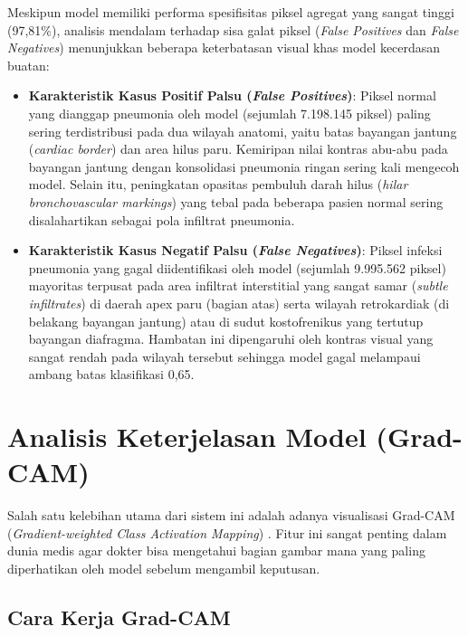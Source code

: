\documentclass[12pt,a4paper,oneside]{book}
\begin{document}
Meskipun model memiliki performa spesifisitas piksel agregat yang sangat tinggi (97,81\%), analisis mendalam terhadap sisa galat piksel (\textit{False Positives} dan \textit{False Negatives}) menunjukkan beberapa keterbatasan visual khas model kecerdasan buatan:
\begin{itemize}
  \item \textbf{Karakteristik Kasus Positif Palsu (\textit{False Positives})}: Piksel normal yang dianggap pneumonia oleh model (sejumlah 7.198.145 piksel) paling sering terdistribusi pada dua wilayah anatomi, yaitu batas bayangan jantung (\textit{cardiac border}) dan area hilus paru. Kemiripan nilai kontras abu-abu pada bayangan jantung dengan konsolidasi pneumonia ringan sering kali mengecoh model. Selain itu, peningkatan opasitas pembuluh darah hilus (\textit{hilar bronchovascular markings}) yang tebal pada beberapa pasien normal sering disalahartikan sebagai pola infiltrat pneumonia.
  \item \textbf{Karakteristik Kasus Negatif Palsu (\textit{False Negatives})}: Piksel infeksi pneumonia yang gagal diidentifikasi oleh model (sejumlah 9.995.562 piksel) mayoritas terpusat pada area infiltrat interstitial yang sangat samar (\textit{subtle infiltrates}) di daerah apex paru (bagian atas) serta wilayah retrokardiak (di belakang bayangan jantung) atau di sudut kostofrenikus yang tertutup bayangan diafragma. Hambatan ini dipengaruhi oleh kontras visual yang sangat rendah pada wilayah tersebut sehingga model gagal melampaui ambang batas klasifikasi 0,65.
\end{itemize}

\section{Analisis Keterjelasan Model (Grad-CAM)}

Salah satu kelebihan utama dari sistem ini adalah adanya visualisasi Grad-CAM (\textit{Gradient-weighted Class Activation Mapping}) \parencite{selvaraju2017gradcam}. Fitur ini sangat penting dalam dunia medis agar dokter bisa mengetahui bagian gambar mana yang paling diperhatikan oleh model sebelum mengambil keputusan.

\subsection{Cara Kerja Grad-CAM}
\end{document}
